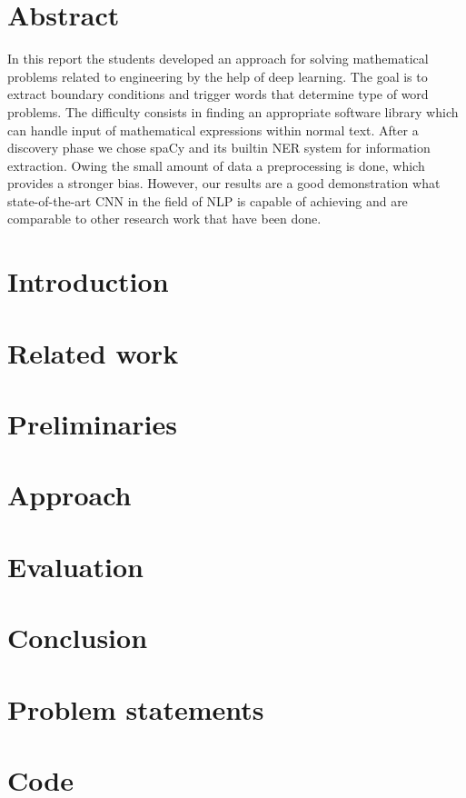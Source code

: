 \documentclass[12pt]{report}
\begin{document}
\chapter*{Abstract}
In this report the students developed an approach for solving mathematical problems related to engineering by the help of deep learning. The goal is to extract boundary conditions and trigger words that determine type of word problems. The difficulty consists in finding an appropriate software library which can handle input of mathematical expressions within normal text. After a discovery phase we chose spaCy and its builtin NER system for information extraction. Owing the small amount of data a preprocessing is done, which provides a stronger bias. However, our results are a good demonstration what state-of-the-art CNN in the field of NLP is capable of achieving and are comparable to other research work that have been done. 

\tableofcontents
\chapter{Introduction}


\chapter{Related work}


\chapter{Preliminaries}


\chapter{Approach}


\chapter{Evaluation}


\chapter{Conclusion}


\printbibliography

\appendix
\chapter{Problem statements}
\label{problems}


\chapter{Code}
\label{Code}

\end{document}
